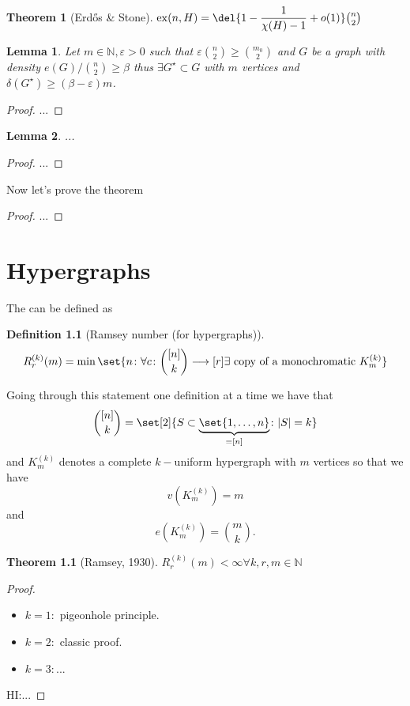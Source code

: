 \documentclass[english, dark, index]{Iart}
\newtheorem{theorem}{Theorem}[part]
\newtheorem{lemma}{Lemma}[theorem]
\newtheorem{definition}{Definition}[part]
\DeclareMathOperator{\ex}{ex}
\begin{document}
	\begin{theorem}[Erdős \& Stone]
		$ \ex(n,H)=\del{1-\dfrac{1}{\chi(H)-1}+o(1)}\binom{n}{2} $
	\end{theorem}
	\begin{lemma}
		Let $ m\in\mathbb{N},\varepsilon>0 $ such that $ \varepsilon\binom{n}{2}\geqslant\binom{m_0}{2} $ and $ G $ be a graph with density $ e(G)/\binom{n}{2}\geqslant \beta $ thus $ \exists G^{\star}\subset G $ with $ m $ vertices and $ \delta(G^{\star})\geqslant(\beta-\varepsilon)m $.
	\end{lemma}
	\begin{proof}
		...
	\end{proof}
	\begin{lemma}
		...
	\end{lemma}
	\begin{proof}
		...
	\end{proof}
	Now let's prove the theorem
	\begin{proof}
		...
	\end{proof}
	
	
	\chapter{Hypergraphs}
	
	The  can be defined as
	\begin{definition}[Ramsey number (for hypergraphs)]
		\[ R^{(k)}_r(m)=\min\set{n\colon\forall c\colon\binom{[n]}{k}\longrightarrow[r]\exists \textup{ copy of a monochromatic }K^{(k)}_m} \]
	\end{definition}
	Going through this statement one definition at a time we have that
	\[ \binom{[n]}{k}=\set[2]{S\subset\underbrace{\set{1,\ldots,n}}_{=[n]}\colon |S|=k} \]
	and $ K^{(k)}_m $ denotes a complete $ k- $uniform hypergraph with $ m $ vertices so that we have
	\[ v(K^{(k)}_m)=m \]
	and
	\[ e(K^{(k)}_m)=\binom{m}{k}. \]
	
	\begin{theorem}[Ramsey, 1930]
		$ R^{(k)}_r(m)<\infty\forall k,r,m\in\mathbb{N} $
	\end{theorem}
	\begin{proof}
		\begin{itemize}
			\item $ k=1: $ pigeonhole principle.
			\item $ k=2: $ classic proof.
			\item $ k=3: $...
		\end{itemize}
	
		HI:...
	\end{proof}
\end{document}
